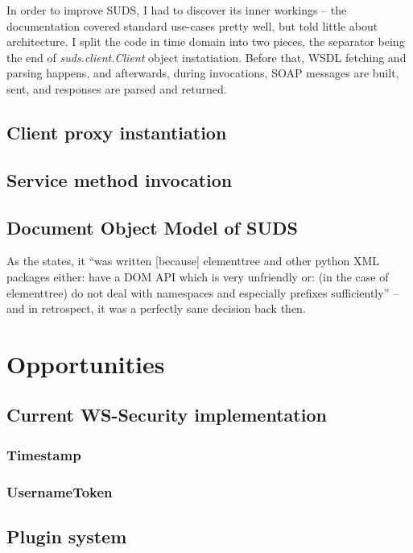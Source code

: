 In order to improve SUDS, I had to discover its inner workings -- the documentation covered standard use-cases pretty well, but told little about architecture. I split the code in time domain into two pieces, the separator being the end of \emph{suds.client.Client} object instatiation. Before that, WSDL fetching and parsing happens, and afterwards, during invocations, SOAP messages are built, sent, and responses are parsed and returned.

\subsection{Client proxy instantiation}


\subsection{Service method invocation}


\subsection{Document Object Model of SUDS}


As the \cite{suds-doc} states, it ``was written [because] elementtree and other python XML packages either: have a DOM API which is very unfriendly or: (in the case of elementtree) do not deal with namespaces and especially prefixes sufficiently'' -- and in retrospect, it was a perfectly sane decision back then.


\section{Opportunities}

\subsection{Current WS-Security implementation}

\subsubsection{Timestamp}


\subsubsection{UsernameToken}
\label{sudsUsernameToken}


\subsection{Plugin system}

